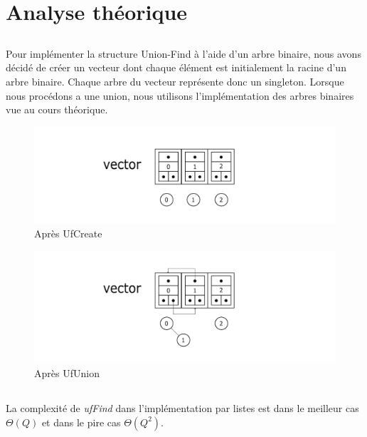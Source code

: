 
\usepackage{clrscode3e}





\section{Analyse théorique}
\subsection{} %
	Pour implémenter la structure Union-Find à l'aide d'un arbre binaire, nous avons décidé de créer un vecteur dont chaque élément est initialement la racine d'un arbre binaire. Chaque arbre du vecteur représente donc un singleton. Lorsque nous procédons a une union, nous utilisons l'implémentation des arbres binaires vue au cours théorique.
	\begin{figure}[h]
		\caption{Après UfCreate}
		\includegraphics[scale=0.75]{1}
	\end{figure}

	\begin{figure}[h]
		\caption{Après UfUnion}
		\includegraphics[scale=0.75]{2}
	\end{figure}

\subsection{} %
La complexité de \textit{ufFind} dans l'implémentation par listes est dans le meilleur cas $\Theta(Q)$ et dans le pire cas $\Theta(Q^2)$.

